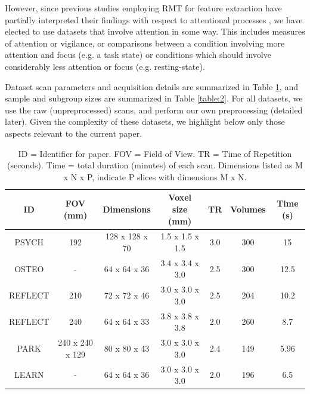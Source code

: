 \documentclass[NETN,manuscript]{stjour-new}
\begin{document}
However, since previous studies employing RMT for feature extraction have partially interpreted
their findings with respect to attentional processes
\citep{wangRandomMatrixTheory2016,matharooSpontaneousBackpainAlters2020}, we have elected to use
datasets that involve attention in some way. This includes measures of attention or vigilance, or
comparisons between a condition involving more attention and focus (e.g. a task state) or conditions
which should involve considerably less attention or focus (e.g. resting-state).

Dataset scan parameters and acquisition details are summarized in Table \ref{table:1}, and sample
and subgroup sizes are summarized in Table \ref{table:2}. For all datasets, we use the raw
(unpreprocessed) scans, and perform our own preprocessing (detailed later). Given the complexity of
these datasets, we highlight below only those aspects relevant to the current paper.

\begin{table}[h!]
\small
\centering
\begin{tabular}{ c c c c c c c }
\hline
\textbf{ID}  & \textbf{FOV (mm)}  & \textbf{Dimensions}  & \textbf{Voxel size (mm)} & \textbf{TR} & \textbf{Volumes} & \textbf{Time (s)} \\
\hline
PSYCH   &  192              & 128 x 128 x 70 & 1.5 x 1.5 x 1.5 & 3.0 & 300 & 15 \\
OSTEO   &  -                & 64 x 64 x 36   & 3.4 x 3.4 x 3.0 & 2.5 & 300 & 12.5 \\
REFLECT &  210              & 72 x 72 x 46   & 3.0 x 3.0 x 3.0 & 2.5 & 204 & 10.2 \\
REFLECT &  240              & 64 x 64 x 33   & 3.8 x 3.8 x 3.8 & 2.0 & 260 & 8.7 \\
PARK    &  240 x 240 x 129  & 80 x 80 x 43   & 3.0 x 3.0 x 3.0 & 2.4 & 149 & 5.96 \\
LEARN   &  -                & 64 x 64 x 36   & 3.0 x 3.0 x 3.0 & 2.0 & 196 & 6.5 \\
\hline
\end{tabular}
\caption{
    ID = Identifier for paper. FOV = Field of View. TR = Time of Repetition (seconds).
    Time = total duration (minutes) of each scan. Dimensions listed as M x N x P,
    indicate P slices with dimensions M x N.
}
\label{table:1}
\end{table}
\end{document}
